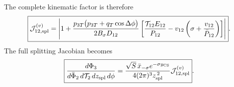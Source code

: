 \documentclass[11pt]{article}
\newcommand{\Ph}{\Phi}
\begin{document}
The complete kinematic factor is therefore
\begin{equation}
\boxed{
\mathcal J_{12,\rm spl}^{(v)}
=
\left|
1+
\frac{
p_{3T}\bigl(p_{3T}+q_T\cos\Delta\phi\bigr)
}{
2B_\sigma D_{12}
}
\left[
\frac{\mathcal T_{12}E_{12}}{P_{12}}
-v_{12}
\left(
\sigma+\frac{v_{12}}{\bar P_{12}}
\right)
\right]
\right|
}.
\label{eq:isrfsr-zrepair-splitting-kinematic-jacobian}
\end{equation}
The full splitting Jacobian becomes
\begin{equation}
\boxed{
\frac{d\Ph_3}
{d\bar\Ph_2\,d\mathcal T_2\,dz_{\rm spl}\,d\phi}
=
\frac{
\sqrt S\,\bar x_{-\sigma}e^{-\sigma y_{\rm CS}}
}{
4(2\pi)^3z_{\rm spl}^{\,2}
}
\mathcal J_{12,\rm spl}^{(v)}
}.
\label{eq:isrfsr-zrepair-splitting-jacobian}
\end{equation}
\end{document}
